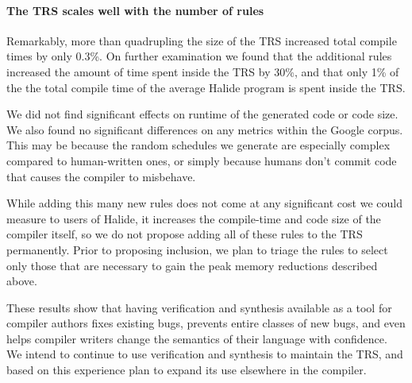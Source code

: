 \documentclass[acmsmall,review]{acmart}\settopmatter{printfolios=true,printccs=false,printacmref=false}
\newcommand{\hmax}[0]{\texttt{max}}
\newcommand{\hmin}[0]{\texttt{min}}
\newcommand{\rewrites}[0]{\:\rightarrow_{R}\:}
\begin{document}
\paragraph{The TRS scales well with the number of rules}
Remarkably, more than quadrupling the size of the TRS increased total compile
times by only 0.3\%. On further examination we found that the
additional rules increased the amount of time spent inside the TRS by
30\%, and that only 1\% of the the total compile time of the average
Halide program is spent inside the TRS.

We did not find significant effects on runtime of the generated code or code size. We also found no significant differences on any metrics within the Google corpus. This may be because the random schedules we generate are especially complex compared to human-written ones, or simply because humans don’t commit code that causes the compiler to misbehave.

While adding this many new rules does not come at any significant cost we could measure to users of Halide, it increases the compile-time and code size of the compiler itself, so we do not propose adding all of these rules to the TRS permanently. Prior to proposing inclusion, we plan to triage the rules to select only those that are necessary to gain the peak memory reductions described above.

These results show that having verification and synthesis available as a tool for compiler authors fixes existing bugs, prevents entire classes of new bugs, and even helps compiler writers change the semantics of their language with confidence. We intend to continue to use verification and synthesis to maintain the TRS, and based on this experience plan to expand its use elsewhere in the compiler.





\end{document}
